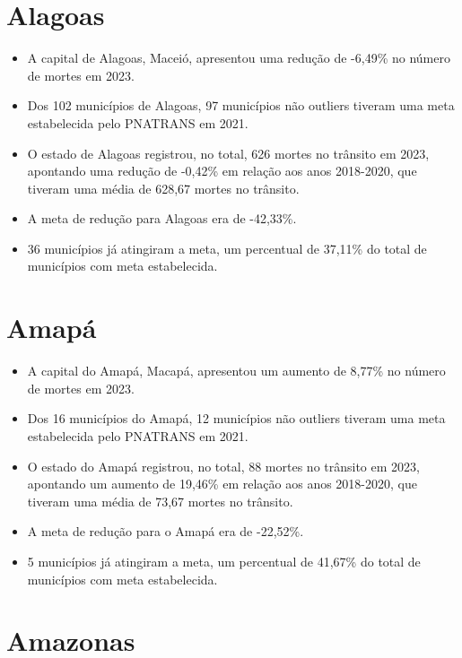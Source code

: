 \documentclass[
  letterpaper,
  DIV=11,
  numbers=noendperiod]{scrreprt}
\begin{document}
\section{Alagoas}\label{alagoas}

\begin{itemize}
\item
  A capital de Alagoas, Maceió, apresentou uma redução de -6,49\% no
  número de mortes em 2023.
\item
  Dos 102 municípios de Alagoas, 97 municípios não outliers tiveram uma
  meta estabelecida pelo PNATRANS em 2021.
\item
  O estado de Alagoas registrou, no total, 626 mortes no trânsito em
  2023, apontando uma redução de -0,42\% em relação aos anos 2018-2020,
  que tiveram uma média de 628,67 mortes no trânsito.
\item
  A meta de redução para Alagoas era de -42,33\%.
\item
  36 municípios já atingiram a meta, um percentual de 37,11\% do total
  de municípios com meta estabelecida.
\end{itemize}

\section{Amapá}\label{amapuxe1}

\begin{itemize}
\item
  A capital do Amapá, Macapá, apresentou um aumento de 8,77\% no número
  de mortes em 2023.
\item
  Dos 16 municípios do Amapá, 12 municípios não outliers tiveram uma
  meta estabelecida pelo PNATRANS em 2021.
\item
  O estado do Amapá registrou, no total, 88 mortes no trânsito em 2023,
  apontando um aumento de 19,46\% em relação aos anos 2018-2020, que
  tiveram uma média de 73,67 mortes no trânsito.
\item
  A meta de redução para o Amapá era de -22,52\%.
\item
  5 municípios já atingiram a meta, um percentual de 41,67\% do total de
  municípios com meta estabelecida.
\end{itemize}

\section{Amazonas}\label{amazonas}
\end{document}
